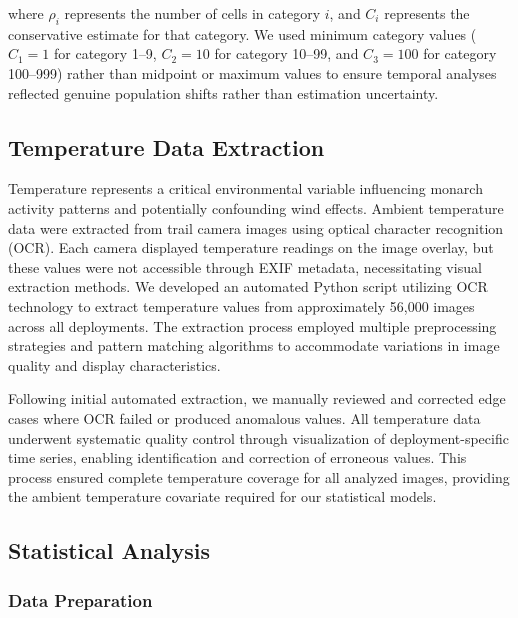 where $\rho_i$ represents the number of cells in category $i$, and $C_i$ represents the conservative estimate for that category. We used minimum category values ($C_1 = 1$ for category 1–9, $C_2 = 10$ for category 10–99, and $C_3 = 100$ for category 100–999) rather than midpoint or maximum values to ensure temporal analyses reflected genuine population shifts rather than estimation uncertainty.

\subsection{Temperature Data Extraction}

Temperature represents a critical environmental variable influencing monarch activity patterns and potentially confounding wind effects. Ambient temperature data were extracted from trail camera images using optical character recognition (OCR). Each camera displayed temperature readings on the image overlay, but these values were not accessible through EXIF metadata, necessitating visual extraction methods. We developed an automated Python script utilizing OCR technology to extract temperature values from approximately 56,000 images across all deployments. The extraction process employed multiple preprocessing strategies and pattern matching algorithms to accommodate variations in image quality and display characteristics.

Following initial automated extraction, we manually reviewed and corrected edge cases where OCR failed or produced anomalous values. All temperature data underwent systematic quality control through visualization of deployment-specific time series, enabling identification and correction of erroneous values. This process ensured complete temperature coverage for all analyzed images, providing the ambient temperature covariate required for our statistical models.

\subsection{Statistical Analysis}
\label{sec:statistical-analysis}

\subsubsection{Data Preparation}

